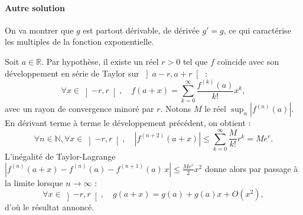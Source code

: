 









\paragraph{Autre solution} %
On va montrer que $g$ est partout dérivable, de dérivée $g'=g$, ce qui caractérise les multiples de la fonction exponentielle.

Soit $a \in \mathbb R$. Par hypothèse, il existe un réel $r > 0$ tel que $f$ coïncide avec son développement en série de Taylor sur $\left]a-r,a+r\right[$ :
\[
\forall x \in \left]-r,r\right[,\quad f(a+x) = \sum_{k=0}^\infty \frac{f^{(k)}(a)}{k!}x^k,
\]
avec un rayon de convergence minoré par $r$. Notons $M$ le réel $\sup_n |f^{(n)}(a)|$. En dérivant terme à terme le développement précédent, on obtient :
\[
\forall n\in\mathbb N,\forall x \in \left]-r,r\right[,\quad |f^{(n+2)}(a+x)| \leqslant \sum_{k=0}^\infty \frac{M}{k!}r^k = Me^{r}.
\]
L'inégalité de Taylor-Lagrange $\left|f^{(n)}(a+x) - f^{(n)}(a) -  f^{(n+1)}(a)\,x\right| \leqslant \frac{Me^{r}}2 x^2$ donne alors par passage à la limite lorsque $n \to \infty$ :
\[
\forall x \in \left]-r,r\right[,\quad g(a+x) = g(a) + g(a) x + O(x^2),
\]
d'où le résultat annoncé.


